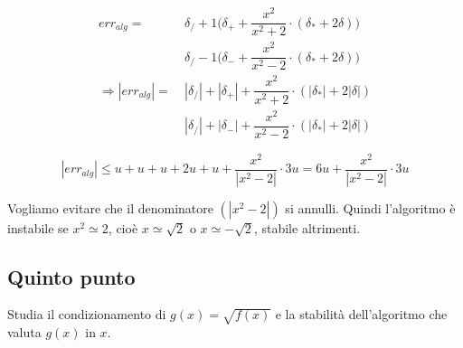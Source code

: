 \begin{center}
\end{center}

\begin{equation*}
\begin{split}
  err_{alg} = &~ \delta_/ +1\Big(\delta_+ +\dfrac{x^2}{x^2+2}\cdot (\delta_* +2\delta)\Big)\\[1.5ex]
  &~ \delta_/ -1\Big(\delta_- +\dfrac{x^2}{x^2-2}\cdot (\delta_* +2\delta)\Big)\\[1.5ex]
  \Rightarrow |err_{alg}| = &~ |\delta_/| + |\delta_+| + \dfrac{x^2}{x^2+2}\cdot (|\delta_*|+2|\delta|)\\[1.5ex]
  &~ |\delta_/| + |\delta_-| + \dfrac{x^2}{x^2-2}\cdot (|\delta_*|+2|\delta|)
\end{split}
\end{equation*}

\begin{equation*}
|err_{alg}| \leq u+u+u+2u+u+\dfrac{x^2}{|x^2-2|}\cdot 3u = 6u + \dfrac{x^2}{|x^2-2|}\cdot 3u
\end{equation*}

Vogliamo evitare che il denominatore $(|x^2-2|)$ si annulli. Quindi l'algoritmo è instabile se $x^2\simeq 2$, cioè $x\simeq \sqrt{2}$ o $x\simeq -\sqrt{2}$, stabile altrimenti.


\subsection{Quinto punto} Studia il condizionamento di $g(x)=\sqrt{f(x)}$ e la stabilità dell'algoritmo che valuta $g(x)$ in $x$.\\

